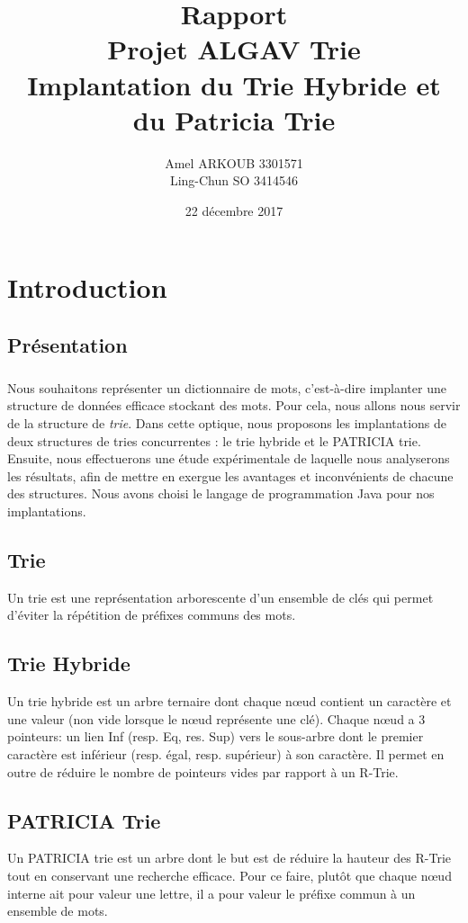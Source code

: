 \documentclass[a4paper,12pt]{report}
\title{\Huge Rapport \\ Projet ALGAV Trie \\ \large Implantation du Trie Hybride et du Patricia Trie}
\author{Amel ARKOUB 3301571 \\ Ling-Chun SO 3414546}
\date{22 décembre 2017}
\begin{document}
\maketitle

\tableofcontents
\newpage

\chapter{Introduction}
\section*{Présentation}
\paragraph*{}
Nous souhaitons représenter un dictionnaire de mots, c'est-à-dire implanter une structure de
données efficace stockant des mots. Pour cela, nous allons nous servir de la structure de {\itshape trie}.
Dans cette optique, nous proposons les implantations de deux structures de tries concurrentes : le trie hybride
et le PATRICIA trie. Ensuite, nous effectuerons une étude expérimentale de laquelle nous analyserons les résultats, afin de mettre en exergue
les avantages et inconvénients de chacune des structures. Nous avons choisi le langage de programmation Java pour nos implantations.

\section*{Trie}
Un trie est une représentation arborescente d'un ensemble de clés qui permet d'éviter la répétition de préfixes communs des mots.

\section*{Trie Hybride}
Un trie hybride est un arbre ternaire dont chaque nœud contient un caractère et une valeur (non vide
lorsque le nœud représente une clé). Chaque nœud a 3 pointeurs: un lien Inf (resp. Eq, res. Sup) vers le sous-arbre dont le premier caractère est inférieur (resp. égal, resp. supérieur) à son caractère. Il permet en outre
de réduire le nombre de pointeurs vides par rapport à un R-Trie.

\section*{PATRICIA Trie}
Un PATRICIA trie est un arbre dont le but est de réduire la hauteur des R-Trie tout en conservant une recherche
efficace. Pour ce faire, plutôt que chaque nœud interne ait pour valeur une lettre, il a pour valeur le préfixe commun à un ensemble de mots.
\end{document}
